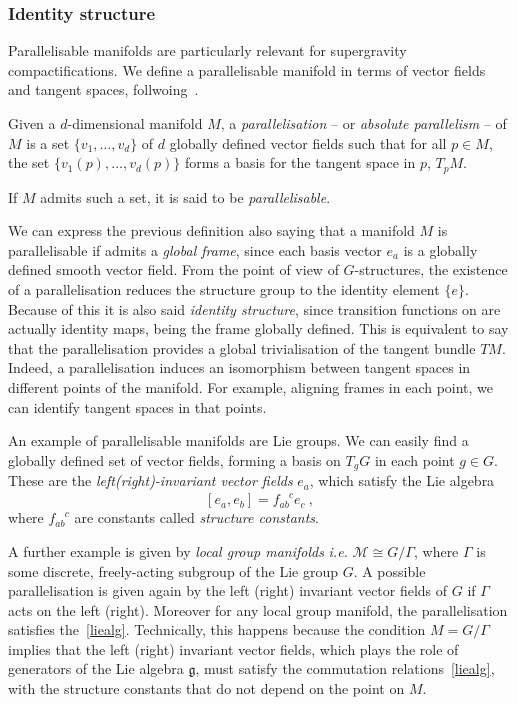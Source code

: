 \documentclass[debug]{phd}
\begin{document}
					\subsubsection{Identity structure}
						Parallelisable manifolds are particularly relevant for supergravity compactifications.
						We define a parallelisable manifold in terms of vector fields and tangent spaces, follwoing~\cite{Nakahara}.
						
						Given a $d$-dimensional manifold $M$, a \emph{parallelisation} -- or \emph{absolute parallelism} -- of $M$ is a set $\{ v_1 ,\ldots, v_d\}$ of $d$ globally defined vector fields such that for all $p \in M$, the set $\{ v_1(p) ,\ldots, v_d(p)\} $ forms a basis for the tangent space in $p$, $T_p M$.
							
						If $M$ admits such a set, it is said to be \emph{parallelisable}.

						We can express the previous definition also saying that a manifold $M$ is parallelisable if admits a \emph{global frame}, since each basis vector $e_a$ is a globally defined smooth vector field.			
						From the point of view of $G$-structures, the existence of a parallelisation reduces the structure group to the identity element $\{e\}$.
						Because of this it is also said \emph{identity structure}, since transition functions on are actually identity maps, being the frame globally defined.
						This is equivalent to say that the parallelisation provides a global trivialisation of the tangent bundle $TM$.						
						Indeed, a parallelisation induces an isomorphism between tangent spaces in different points of the manifold.
						For example, aligning frames in each point, we can identify tangent spaces in that points. 
						
						An example of parallelisable manifolds are Lie groups.
						We can easily find a globally defined set of vector fields, forming a basis on $T_gG$ in each point $g \in G$. 
						These are the \emph{left(right)-invariant vector fields} $e_a$, which satisfy the Lie algebra
							\begin{equation}
							\label{liealg}
								\left[e_a , e_b \right] = f_{ab}^{\phantom{ab}c}e_c\ ,
							\end{equation}
						where $f_{ab}^{\phantom{ab}c}$ are constants called \emph{structure constants}.
						
						A further example is given by \emph{local group manifolds} \emph{i.e.} $ \mathcal{M} \cong G/\Gamma$, where $\Gamma$ is some discrete, freely-acting subgroup of the Lie group $G$.
						A possible parallelisation is given again by the left (right) invariant vector fields of $G$ if $\Gamma$ acts on the left (right). Moreover for any local group manifold, the parallelisation satisfies the~\eqref{liealg}.
						Technically, this happens because the condition $M = G / \Gamma$ implies that the left (right) invariant vector fields, which plays the role of generators of the Lie algebra $\mathfrak{g}$, must satisfy the commutation relations~\eqref{liealg}, with the structure constants that do not depend on the point on $M$.
						
\end{document}
